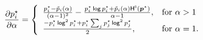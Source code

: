 \begin{equation}\label{eq:final_gradient_alpha_supp}
    \frac{\partial p_i^{\star}}{\partial \alpha} =
    \left\{
    \begin{array}{ll}
        \frac{p_i^{\star} - \tilde{p}_i(\alpha)}{(\alpha-1)^2} - \frac{p_i^{\star}\operatorname*{\mathsf{log}} p_i^{\star} + \tilde{p}_i(\alpha)\mathsf{H}^{\textsc{s}}(\bm{p}^{\star})}{\alpha-1}, & \text{for $\alpha > 1$}  \\
        \frac{- p_i^{\star}\operatorname*{\mathsf{log}}^2 p_i^{\star} + p_i^{\star} \sum_j p_j^{\star}\operatorname*{\mathsf{log}}^2 p_j^{\star}}{2},                                                    & \text{for $\alpha = 1$.}
    \end{array}
    \right.
\end{equation}

\cleardoublepage
\singlespacing